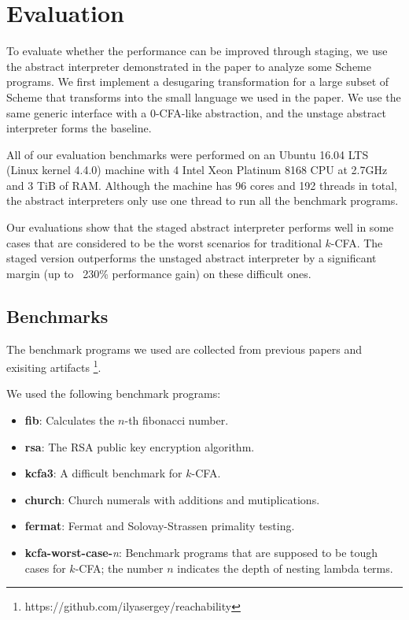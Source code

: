 \section{Evaluation} \label{evaluation}

To evaluate whether the performance can be improved through staging, we use the
abstract interpreter demonstrated in the paper to analyze some Scheme programs.
We first implement a desugaring transformation for a large subset of Scheme that
transforms into the small language we used in the paper. We use the same generic
interface with a 0-CFA-like abstraction, and the unstage abstract interpreter
forms the baseline.

All of our evaluation benchmarks were performed on an Ubuntu 16.04 LTS (Linux
kernel 4.4.0) machine with 4 Intel Xeon Platinum 8168 CPU at 2.7GHz and 3 TiB of
RAM. Although the machine has 96 cores and 192 threads in total, the abstract
interpreters only use one thread to run all the benchmark programs.

Our evaluations show that the staged abstract interpreter performs well in some
cases that are considered to be the worst scenarios for traditional $k$-CFA. The
staged version outperforms the unstaged abstract interpreter by a significant
margin (up to ~230\% performance gain) on these difficult ones.

\subsection{Benchmarks}

The benchmark programs we used are collected from previous papers
\cite{Johnson:2013:OAA:2500365.2500604, ashley:practical,
DBLP:journals/corr/abs-1102-3676} and exisiting artifacts
\footnote{https://github.com/ilyasergey/reachability}.

We used the following benchmark programs:

\begin{itemize}
    \item \textbf{fib}: Calculates the $n$-th fibonacci number.
    \item \textbf{rsa}: The RSA public key encryption algorithm.
    \item \textbf{kcfa3}: A difficult benchmark for $k$-CFA.
    \item \textbf{church}: Church numerals with additions and mutiplications.
    \item \textbf{fermat}: Fermat and Solovay-Strassen primality testing.
    \item \textbf{kcfa-worst-case-}\textit{n}: 
      Benchmark programs that are supposed to be tough cases for $k$-CFA; 
      the number $n$ indicates the depth of nesting lambda terms.
\end{itemize}

